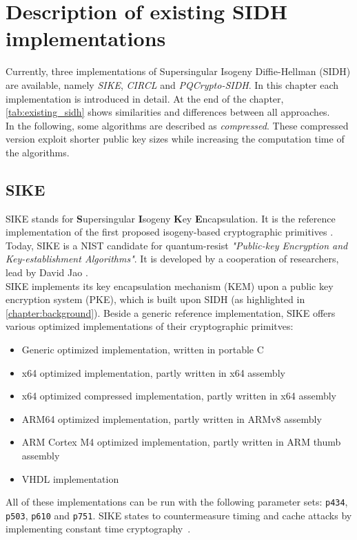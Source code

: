 \chapter{Description of existing SIDH implementations}\label{chapter:existing_sidh}
Currently, three implementations of Supersingular Isogeny Diffie-Hellman (SIDH) are available, namely \textit{SIKE}, \textit{CIRCL} and \textit{PQCrypto-SIDH}. In this chapter each implementation is introduced in detail. At the end of the chapter, \autoref{tab:existing_sidh} shows similarities and differences between all approaches.
\\
In the following, some algorithms are described as \textit{compressed}. These compressed version exploit shorter public key sizes while increasing the computation time of the algorithms.

\section{SIKE}
SIKE stands for \textbf{S}upersingular \textbf{I}sogeny \textbf{K}ey \textbf{E}ncapsulation. It is the reference implementation of the first proposed isogeny-based cryptographic primitives \parencite{jao2011towards}. Today, SIKE is a NIST candidate for quantum-resist \textit{"Public-key Encryption and Key-establishment Algorithms"}. It is developed by a cooperation of researchers, lead by David Jao \parencite{sike2020spec}.
\\
SIKE implements its key encapsulation mechanism (KEM) upon a public key encryption system (PKE), which is built upon SIDH (as highlighted in \autoref{chapter:background}). Beside a generic reference implementation, SIKE offers various optimized implementations of their cryptographic primitves:
\begin{itemize}
  \item Generic optimized implementation, written in portable C
  \item x64 optimized implementation, partly written in x64 assembly
  \item x64 optimized compressed implementation, partly written in x64 assembly
  \item ARM64 optimized implementation, partly written in ARMv8 assembly
  \item ARM Cortex M4 optimized implementation, partly written in ARM thumb assembly
  \item VHDL implementation
\end{itemize}
All of these implementations can be run with the following parameter sets: \texttt{p434}, \texttt{p503}, \texttt{p610} and \texttt{p751}. SIKE states to countermeasure timing and cache attacks by implementing constant time cryptography~\parencite{sike2020spec}.

